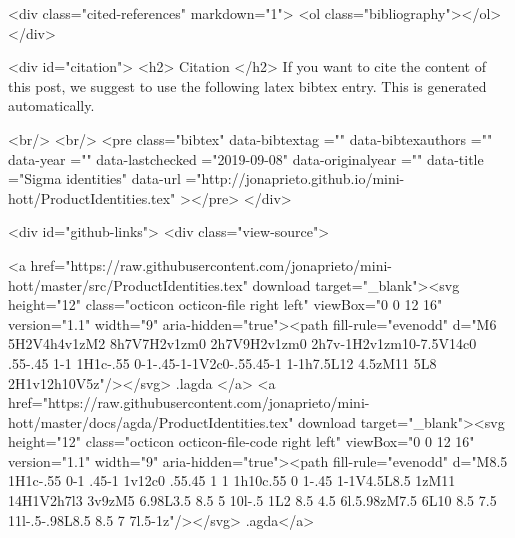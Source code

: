   <div class="cited-references" markdown="1">
  <ol class="bibliography"></ol>
  </div>


  
  <div id="citation">
  <h2> Citation </h2>
  If you want to cite the content of this post,
  we suggest to use the following latex bibtex entry.
  This is generated automatically.

  <br/>
  <br/>
  <pre class="bibtex"
       data-bibtextag =""
       data-bibtexauthors =""
       data-year =""
       data-lastchecked ="2019-09-08"
       data-originalyear =""
       data-title ="Sigma identities"
       data-url ="http://jonaprieto.github.io/mini-hott/ProductIdentities.tex"
  ></pre>
  </div>
  

  <div id="github-links">
    <div class="view-source">
      
        <a href="https://raw.githubusercontent.com/jonaprieto/mini-hott/master/src/ProductIdentities.tex" download target="_blank"><svg height="12" class="octicon octicon-file right left" viewBox="0 0 12 16" version="1.1" width="9" aria-hidden="true"><path fill-rule="evenodd" d="M6 5H2V4h4v1zM2 8h7V7H2v1zm0 2h7V9H2v1zm0 2h7v-1H2v1zm10-7.5V14c0 .55-.45 1-1 1H1c-.55 0-1-.45-1-1V2c0-.55.45-1 1-1h7.5L12 4.5zM11 5L8 2H1v12h10V5z"/></svg> .lagda </a>
        <a href="https://raw.githubusercontent.com/jonaprieto/mini-hott/master/docs/agda/ProductIdentities.tex" download target="_blank"><svg height="12" class="octicon octicon-file-code right left" viewBox="0 0 12 16" version="1.1" width="9" aria-hidden="true"><path fill-rule="evenodd" d="M8.5 1H1c-.55 0-1 .45-1 1v12c0 .55.45 1 1 1h10c.55 0 1-.45 1-1V4.5L8.5 1zM11 14H1V2h7l3 3v9zM5 6.98L3.5 8.5 5 10l-.5 1L2 8.5 4.5 6l.5.98zM7.5 6L10 8.5 7.5 11l-.5-.98L8.5 8.5 7 7l.5-1z"/></svg> .agda</a>
      
